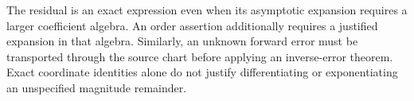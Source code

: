 The residual is an exact expression even when its asymptotic expansion
requires a larger coefficient algebra. An order assertion additionally
requires a justified expansion in that algebra. Similarly, an unknown
forward error must be transported through the source chart before applying
an inverse-error theorem. Exact coordinate identities alone do not justify
differentiating or exponentiating an unspecified magnitude remainder.
